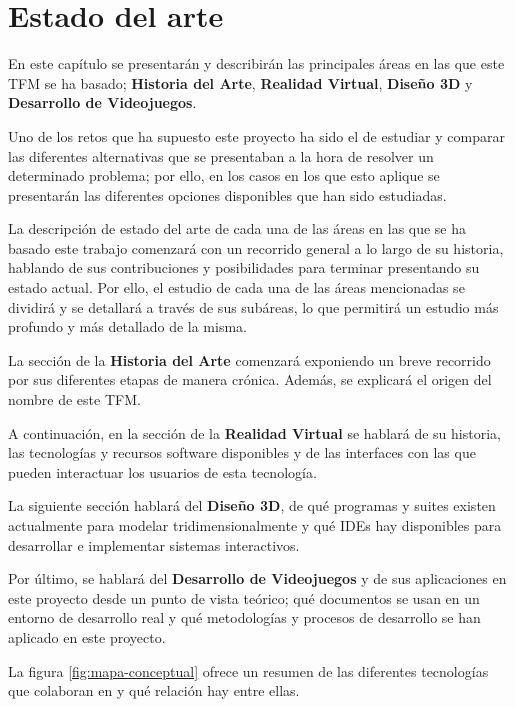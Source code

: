 \chapter{Estado del arte}
\label{chap:estado_arte}

En este capítulo se presentarán y describirán las principales áreas en las que este \acs{TFM} se ha basado; \textbf{Historia del Arte}, \textbf{Realidad Virtual}, \textbf{Diseño 3D} y \textbf{Desarrollo de Videojuegos}.

Uno de los retos que ha supuesto este proyecto ha sido el de estudiar y comparar las diferentes alternativas que se presentaban a la hora de resolver un determinado problema; por ello, en los casos en los que esto aplique se presentarán las diferentes opciones disponibles que han sido estudiadas.

La descripción de estado del arte de cada una de las áreas en las que se ha basado este trabajo comenzará con un recorrido general a lo largo de su historia, hablando de sus contribuciones y posibilidades para terminar presentando su estado actual. Por ello, el estudio de cada una de las áreas mencionadas se dividirá y se detallará a través de sus subáreas, lo que permitirá un estudio más profundo y más detallado de la misma.

La sección de la \textbf{Historia del Arte} comenzará exponiendo un breve recorrido por sus diferentes etapas de manera crónica. Además, se explicará el origen del nombre de este \acs{TFM}.

A continuación, en la sección de la \textbf{Realidad Virtual} se hablará de su historia, las tecnologías y recursos software disponibles y de las interfaces con las que pueden interactuar los usuarios de esta tecnología.

La siguiente sección hablará del \textbf{Diseño 3D}, de qué programas y suites existen actualmente para modelar tridimensionalmente y qué \acs{IDE}s hay disponibles para desarrollar e implementar sistemas interactivos.

Por último, se hablará del \textbf{Desarrollo de Videojuegos} y de sus aplicaciones en este proyecto desde un punto de vista teórico; qué documentos se usan en un entorno de desarrollo real y qué metodologías y procesos de desarrollo se han aplicado en este proyecto.

La figura \ref{fig:mapa-conceptual} ofrece un resumen de las diferentes tecnologías que colaboran en \MineRVa y qué relación hay entre ellas.

\vspace{0.4cm}

